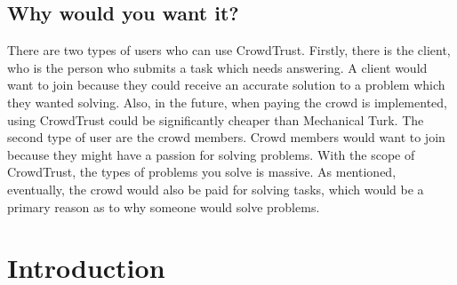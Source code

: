 \documentclass[11pt]{article}
\begin{document}
\subsection{Why would you want it?}
There are two types of users who can use CrowdTrust. Firstly, there is the client,
who is the person who submits a task which needs answering. A client would want
to join because they could receive an accurate solution to a problem which they
wanted solving. Also, in the future, when paying the crowd is implemented,
using CrowdTrust could be significantly cheaper than Mechanical Turk. The second
type of user are the crowd members. Crowd members would want to join because
they might have a passion for solving problems. With the scope of CrowdTrust,
the types of problems you solve is massive. As mentioned, eventually, the crowd
would also be paid for solving tasks, which would be a primary reason as to why
someone would solve problems.
\newpage
\section{Introduction}
\end{document}
